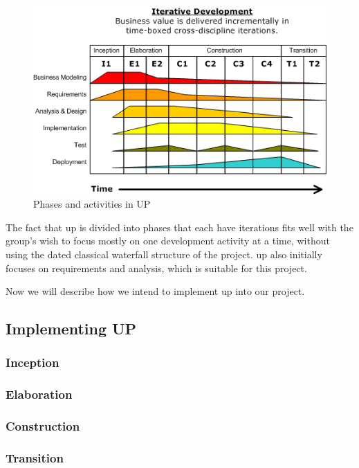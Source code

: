 \begin{figure}[h]
  \centering
    \includegraphics[width=\textwidth]{img/Development-iterative.png}
  \caption{Phases and activities in UP}
  \label{fig:up}
\end{figure}


The fact that \ac{up} is divided into phases that each have iterations fits well with the group's wish to focus mostly on one development activity at a time, without using the dated classical waterfall structure of the project.
\ac{up} also initially focuses on requirements and analysis, which is suitable for this project.\newline

Now we will describe how we intend to implement \ac{up} into our project.

\subsection{Implementing UP}


\subsubsection{Inception}


\subsubsection{Elaboration}


\subsubsection{Construction}


\subsubsection{Transition}


